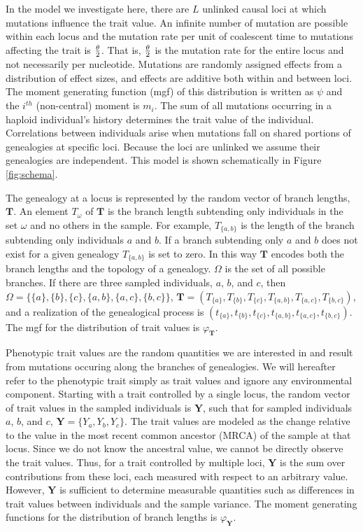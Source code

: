 In the model we investigate here, there are $L$ unlinked causal loci at which
mutations influence the trait value. An infinite number of mutation are possible
within each locus and the mutation rate per unit of coalescent time to mutations
affecting the trait is $\frac{\theta}{2}$. That is, $\frac{\theta}{2}$ is the mutation rate for the entire
locus and not necessarily per nucleotide. Mutations are randomly assigned
effects from a distribution of effect sizes, and effects are additive both
within and between loci. The moment generating function (mgf) of this
distribution is written as $\psi$ and the $i^{th}$ (non-central) moment is
$m_i$. The sum of all mutations occurring in a haploid individual's history
determines the trait value of the individual. Correlations between individuals
arise when mutations fall on shared portions of genealogies at specific loci.
Because the loci are unlinked we assume their genealogies are independent. This
model is shown schematically in Figure \ref{fig:schema}.

The genealogy at a locus is represented by the random vector of branch lengths,
$\mathbf{T}$. An element $T_{\omega}$ of $\mathbf{T}$ is the branch length
subtending only individuals in the set $\omega$ and no others in the sample. For
example, $T_{\{a,b\}}$ is the length of the branch subtending only individuals
$a$ and $b$. If a branch subtending only $a$ and $b$ does not exist for a given
genealogy $T_{\{a,b\}}$ is set to zero. In this way $\mathbf{T}$ encodes both
the branch lengths and the topology of a genealogy. $\Omega$ is the set of all
possible branches. If there are three sampled individuals, $a$, $b$, and $c$,
then $\Omega=\{\{a\},\{b\},\{c\},\{a,b\},\{a,c\},\{b,c\}\}$,
$\mathbf{T}=(T_{\{a\}},T_{\{b\}},T_{\{c\}},T_{\{a,b\}},T_{\{a,c\}},T_{\{b,c\}})$,
and a realization of the genealogical process is
$(t_{\{a\}},t_{\{b\}},t_{\{c\}},t_{\{a,b\}},t_{\{a,c\}},t_{\{b,c\}})$. The mgf
for the distribution of trait values is $\varphi_{\mathbf{T}}$.

Phenotypic trait values are the random quantities we are interested in and
result from mutations occuring along the branches of genealogies. We will
hereafter refer to the phenotypic trait simply as trait values and ignore any
environmental component. Starting with a trait controlled by a single locus, the
random vector of trait values in the sampled individuals is $\mathbf{Y}$, such
that for sampled individuals $a$, $b$, and $c$, $\mathbf{Y}=\{Y_a,Y_b,Y_c\}$.
The trait values are modeled as the change relative to the value in the most
recent common ancestor (MRCA) of the sample at that locus. Since we do not know
the ancestral value, we cannot be directly observe the trait values. Thus, for a
trait controlled by multiple loci, $\mathbf{Y}$ is the sum over contributions
from these loci, each measured with respect to an arbitrary value. However,
$\mathbf{Y}$ is sufficient to determine measurable quantities such as
differences in trait values between individuals and the sample variance. The
moment generating functions for the distribution of branch lengths is
$\varphi_{\mathbf{Y}}$.

